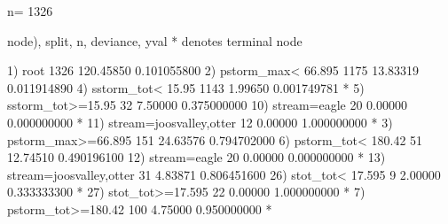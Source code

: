 \documentclass[12pt]{article}
\begin{document}
\begin{Schunk}
\begin{Soutput}
n= 1326 

node), split, n, deviance, yval
      * denotes terminal node

 1) root 1326 120.45850 0.101055800  
   2) pstorm_max< 66.895 1175  13.83319 0.011914890  
     4) sstorm_tot< 15.95 1143   1.99650 0.001749781 *
     5) sstorm_tot>=15.95 32   7.50000 0.375000000  
      10) stream=eagle 20   0.00000 0.000000000 *
      11) stream=joosvalley,otter 12   0.00000 1.000000000 *
   3) pstorm_max>=66.895 151  24.63576 0.794702000  
     6) pstorm_tot< 180.42 51  12.74510 0.490196100  
      12) stream=eagle 20   0.00000 0.000000000 *
      13) stream=joosvalley,otter 31   4.83871 0.806451600  
        26) stot_tot< 17.595 9   2.00000 0.333333300 *
        27) stot_tot>=17.595 22   0.00000 1.000000000 *
     7) pstorm_tot>=180.42 100   4.75000 0.950000000 *
\end{Soutput}
\end{Schunk}
\end{document}
